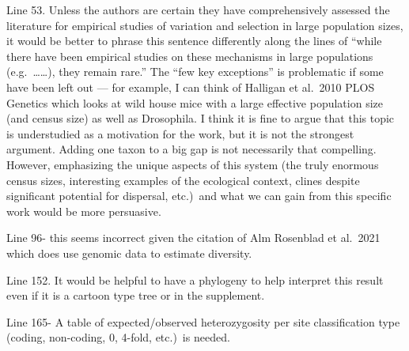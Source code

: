 \begin{point}{} %
Line 53. Unless the authors are certain they have comprehensively
assessed the literature for empirical studies of variation and selection
in large population sizes, it would be better to phrase this sentence
differently along the lines of ``while there have been empirical studies
on these mechanisms in large populations (e.g.\ \ldots\ldots), they
remain rare.'' The ``few key exceptions'' is problematic if some have been
left out --- for example, I can think of Halligan et al.\ 2010 PLOS
Genetics which looks at wild house mice with a large effective population
size (and census size) as well as Drosophila. I think it is fine to argue
that this topic is understudied as a motivation for the work, but it is
not the strongest argument. Adding one taxon to a big gap is not
necessarily that compelling. However, emphasizing the unique aspects of
this system (the truly enormous census sizes, interesting examples of the
ecological context, clines despite significant potential for dispersal,
etc.)\ and what we can gain from this specific work would be more
persuasive.
\end{point}


\begin{point}{} %
Line 96- this seems incorrect given the citation of Alm Rosenblad et al.\
2021 which does use genomic data to estimate diversity.
\end{point}


\begin{point}{} %
Line 152. It would be helpful to have a phylogeny to help interpret this
result even if it is a cartoon type tree or in the supplement.
\end{point}


\begin{point}{} %
Line 165- A table of expected/observed heterozygosity per site
classification type (coding, non-coding, 0, 4-fold, etc.)\ is needed.
\end{point}


